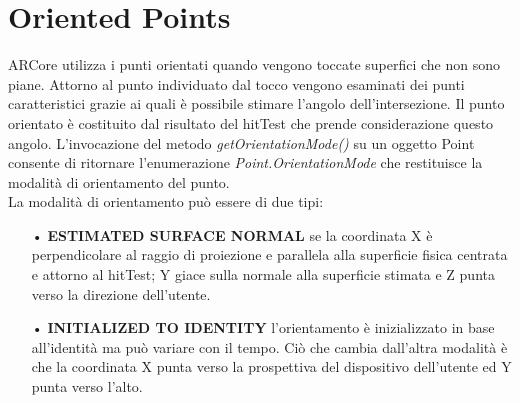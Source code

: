 \documentclass[crop=false, class=book]{standalone}
\begin{document}
		
	\chapter{Oriented Points}
	
		ARCore utilizza i punti orientati quando vengono toccate superfici che non sono piane. Attorno al punto individuato 			dal tocco vengono esaminati dei punti caratteristici grazie ai quali è possibile stimare l'angolo 								dell'intersezione. Il punto orientato è costituito dal risultato del hitTest che prende considerazione questo angolo.
		L'invocazione del metodo \emph{getOrientationMode()} su un oggetto Point consente di ritornare l'enumerazione 					\emph{Point.OrientationMode} che restituisce la modalità di orientamento del punto.\\
		La modalità di orientamento può essere di due tipi:
		\begin{itemize}
			\item[•] \textbf{ESTIMATED SURFACE NORMAL} se la coordinata X è perpendicolare al raggio di proiezione e parallela alla superficie fisica centrata e attorno al hitTest; Y giace sulla normale alla superficie stimata e Z punta verso la direzione dell'utente.
			\item[•] \textbf{INITIALIZED TO IDENTITY} l'orientamento è inizializzato in base all'identità ma può variare con il tempo. Ciò che cambia dall'altra modalità è che la coordinata X punta verso la prospettiva del dispositivo dell'utente ed Y punta verso l'alto.
		\end{itemize}
		
\end{document}
